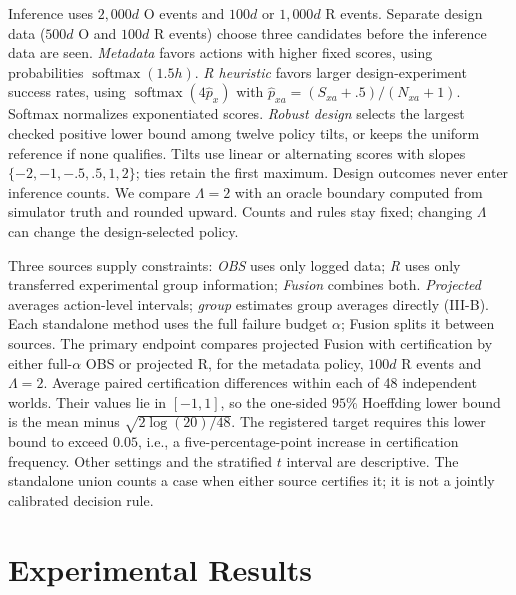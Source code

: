 \documentclass[conference]{IEEEtran}
\begin{document}
Inference uses $2{,}000d$ O events and $100d$ or $1{,}000d$ R events.
Separate design data ($500d$ O and $100d$ R events) choose three candidates before the inference data are seen. \emph{Metadata} favors actions with higher fixed scores, using probabilities $\operatorname{softmax}(1.5h)$. \emph{R heuristic} favors larger design-experiment success rates, using $\operatorname{softmax}(4\widehat p_x)$ with $\widehat p_{xa}=(S_{xa}+.5)/(N_{xa}+1)$. Softmax normalizes exponentiated scores. \emph{Robust design} selects the largest checked positive lower bound among twelve policy tilts, or keeps the uniform reference if none qualifies. Tilts use linear or alternating scores with slopes $\{-2,-1,-.5,.5,1,2\}$; ties retain the first maximum. Design outcomes never enter inference counts. We compare $\Lambda=2$ with an oracle boundary
computed from simulator truth and rounded upward. Counts and rules stay fixed; changing $\Lambda$ can change the design-selected policy.

Three sources supply constraints: \emph{OBS} uses only logged data; \emph{R} uses only transferred experimental group information; \emph{Fusion} combines both. \emph{Projected} averages action-level intervals; \emph{group} estimates group averages directly (III-B). Each standalone method uses the full failure budget $\alpha$; Fusion splits it between sources. The primary endpoint compares projected Fusion with certification by either full-$\alpha$ OBS or projected R, for the metadata policy, $100d$ R events and $\Lambda=2$. Average paired certification differences within each of 48 independent worlds. Their values lie in $[-1,1]$, so the one-sided $95\%$ Hoeffding lower bound is the mean minus $\sqrt{2\log(20)/48}$. The registered target requires this lower bound to exceed $0.05$, i.e., a five-percentage-point increase in certification frequency. Other settings and the stratified $t$ interval are descriptive. The standalone union counts a case when either source certifies it; it is not a jointly calibrated decision rule.






\section{Experimental Results}\label{sec:results}


\end{document}
